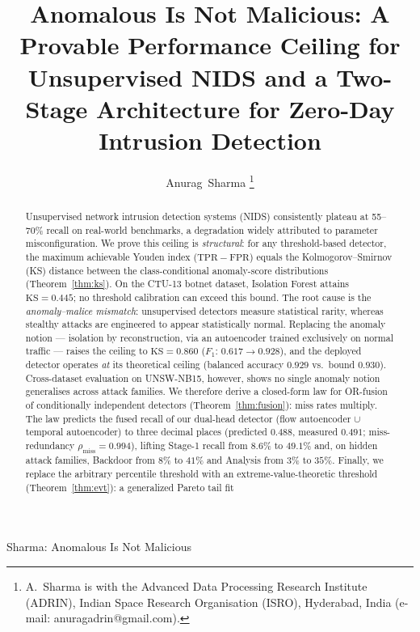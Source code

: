 \documentclass[journal]{IEEEtran}
\newcommand{\TPR}{\mathrm{TPR}}
\newcommand{\FPR}{\mathrm{FPR}}
\newcommand{\KS}{\mathrm{KS}}
\begin{document}
\title{Anomalous Is Not Malicious: A Provable Performance Ceiling for
Unsupervised NIDS and a Two-Stage Architecture for Zero-Day Intrusion Detection}

\author{Anurag~Sharma%
\thanks{A.~Sharma is with the Advanced Data Processing Research Institute
(ADRIN), Indian Space Research Organisation (ISRO), Hyderabad, India
(e-mail: anuragadrin@gmail.com).}}

%
{Sharma: Anomalous Is Not Malicious}

\maketitle

\begin{abstract}
Unsupervised network intrusion detection systems (NIDS) consistently plateau at
55--70\% recall on real-world benchmarks, a degradation widely attributed to
parameter misconfiguration. We prove this ceiling is \emph{structural}: for any
threshold-based detector, the maximum achievable Youden index
($\TPR-\FPR$) equals the Kolmogorov--Smirnov (KS) distance between the
class-conditional anomaly-score distributions (Theorem~\ref{thm:ks}). On the
CTU-13 botnet dataset, Isolation Forest attains $\KS=0.445$; no threshold
calibration can exceed this bound. The root cause is the
\emph{anomaly--malice mismatch}: unsupervised detectors measure statistical
rarity, whereas stealthy attacks are engineered to appear statistically normal.
Replacing the anomaly notion --- isolation by reconstruction, via an
autoencoder trained exclusively on normal traffic --- raises the ceiling to
$\KS=0.860$ ($F_1$: $0.617\!\to\!0.928$), and the deployed detector operates
\emph{at} its theoretical ceiling (balanced accuracy $0.929$ vs.\ bound
$0.930$). Cross-dataset evaluation on UNSW-NB15, however, shows no single
anomaly notion generalises across attack families. We therefore derive a
closed-form law for OR-fusion of conditionally independent detectors
(Theorem~\ref{thm:fusion}): miss rates multiply. The law predicts the fused
recall of our dual-head detector (flow autoencoder $\cup$ temporal autoencoder)
to three decimal places (predicted $0.488$, measured $0.491$;
miss-redundancy $\rho_{\mathrm{miss}}=0.994$), lifting Stage-1 recall from
$8.6\%$ to $49.1\%$ and, on hidden attack families, Backdoor from $8\%$ to
$41\%$ and Analysis from $3\%$ to $35\%$. Finally, we replace the arbitrary
percentile threshold with an extreme-value-theoretic threshold
(Theorem~\ref{thm:evt}): a generalized Pareto tail fit

\end{abstract}
\end{document}
